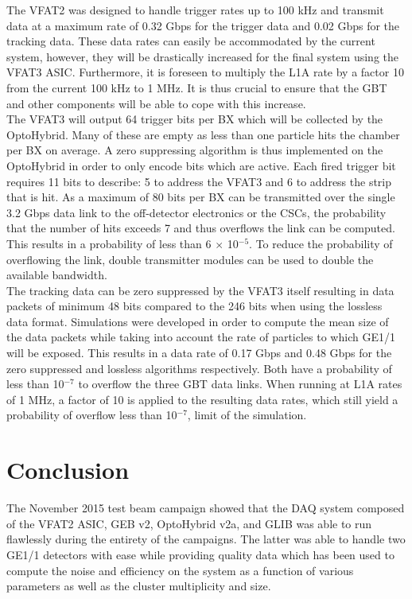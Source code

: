     The VFAT2 was designed to handle trigger rates up to 100 kHz and transmit data at a maximum rate of 0.32 Gbps for the trigger data and 0.02 Gbps for the tracking data. These data rates can easily be accommodated by the current system, however, they will be drastically increased for the final system using the VFAT3 ASIC. Furthermore, it is foreseen to multiply the L1A rate by a factor 10 from the current 100 kHz to 1 MHz. It is thus crucial to ensure that the GBT and other components will be able to cope with this increase. \\

    The VFAT3 will output 64 trigger bits per BX which will be collected by the OptoHybrid. Many of these are empty as less than one particle hits the chamber per BX on average. A zero suppressing algorithm is thus implemented on the OptoHybrid in order to only encode bits which are active. Each fired trigger bit requires 11 bits to describe: 5 to address the VFAT3 and 6 to address the strip that is hit. As a maximum of 80 bits per BX can be transmitted over the single 3.2 Gbps data link to the off-detector electronics or the CSCs, the probability that the number of hits exceeds 7 and thus overflows the link can be computed. This results in a probability of less than 6 $ \times $ 10$^{-5}$. To reduce the probability of overflowing the link, double transmitter modules can be used to double the available bandwidth. \\

    The tracking data can be zero suppressed by the VFAT3 itself resulting in data packets of minimum 48 bits compared to the 246 bits when using the lossless data format. Simulations were developed in order to compute the mean size of the data packets while taking into account the rate of particles to which GE1/1 will be exposed. This results in a data rate of 0.17 Gbps and 0.48 Gbps for the zero suppressed and lossless algorithms respectively. Both have a probability of less than 10$^{-7}$ to overflow the three GBT data links. When running at L1A rates of 1 MHz, a factor of 10 is applied to the resulting data rates, which still yield a probability of overflow less than 10$^{-7}$, limit of the simulation.

  \section{Conclusion}

    The November 2015 test beam campaign showed that the DAQ system composed of the VFAT2 ASIC, GEB v2, OptoHybrid v2a, and GLIB was able to run flawlessly during the entirety of the campaigns. The latter was able to handle two GE1/1 detectors with ease while providing quality data which has been used to compute the noise and efficiency on the system as a function of various parameters as well as the cluster multiplicity and size. \\

